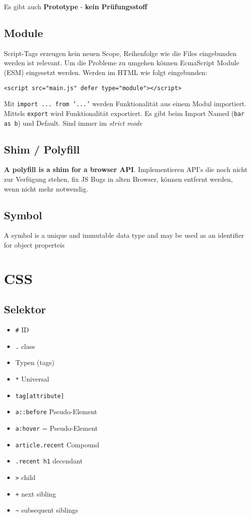 \documentclass[11pt,twoside,landscape]{article}
\begin{document}
\begin{multicols}{4}
Es gibt auch \textbf{Prototype} - \textbf{kein Prüfungsstoff}

\subsection*{Module}
\label{sec:orge2cc30a}
Script-Tags erzeugen kein neuen Scope, Reihenfolge wie die Files eingebunden werden ist relevant. Um die Probleme zu umgehen können EcmaScript Module (ESM) eingesetzt werden. Werden im HTML wie folgt eingebunden:
\begin{verbatim}
<script src="main.js" defer type="module"></script>
\end{verbatim}
Mit \texttt{import ... from '...'} werden Funktionalität aus einem Modul importiert. Mittels \texttt{export} wird Funktionalität exportiert. Es gibt beim Import Named (\texttt{bar as b}) und Default. Sind immer im \emph{strict mode}

\subsection*{Shim / Polyfill}
\label{sec:org0702180}
\textbf{A polyfill is a shim for a browser API}. Implementieren API's die noch nicht zur Verfügung stehen, fix JS Bugs in alten Browser, können entfernt werden, wenn nicht mehr notwendig.

\subsection*{Symbol}
\label{sec:org1e14fd1}
A symbol is a unique and immutable data type and may be used as an identifier for object properteis

\section*{CSS}
\label{sec:org146f093}
\subsection*{Selektor}
\label{sec:org67392bd}
\begin{itemize}
\item \texttt{\#} ID
\item \texttt{.} class
\item Typen (tags)
\item \texttt{*} Universal
\item \texttt{tag[attribute]}
\item \texttt{a::before} Pseudo-Element
\item \texttt{a:hover} = Pseudo-Element
\item \texttt{article.recent} Compound
\item \texttt{.recent h1} decendant
\item \texttt{>} child
\item \texttt{+} next sibling
\item \texttt{\textasciitilde{}} subsequent siblings
\end{itemize}



\end{multicols}
\end{document}
